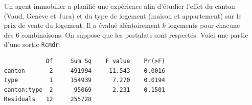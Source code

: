\begin{questions}

\newpage

\question\label{2F} 

Un agent immobilier a planifié une expérience afin d'étudier l'effet du canton (Vaud, Genève et Jura) et du type de logement (maison et appartement) sur le prix de vente du logement. Il a évalué aléatoirement $k$ logements pour chacune des 6 combinaisons. On suppose que les postulats sont respectés. Voici une partie d'une sortie \texttt{Rcmdr}:
\begin{verbatim}
            Df     Sum Sq    F value    Pr(>F)   
canton       2     491994     11.543    0.0016 
type         1     154939      7.270    0.0194  
canton:type  2      95069      2.231    0.1501   
Residuals   12     255728  
\end{verbatim}
\begin{parts}

\end{parts}
\end{questions}
